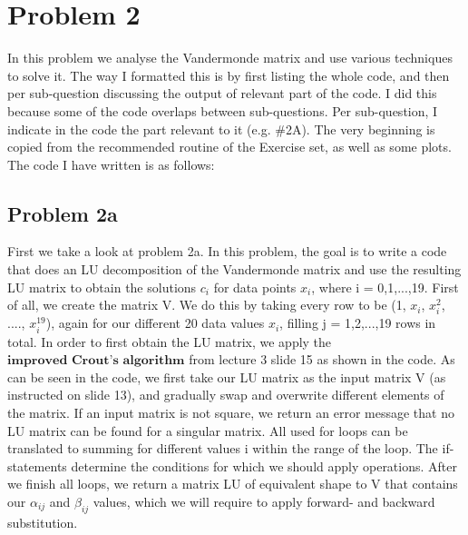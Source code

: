 \section{Problem 2}

In this problem we analyse the Vandermonde matrix and use various techniques to solve it. The way I formatted this is by first listing the whole code, and then per sub-question discussing the output of relevant part of the code. I did this because some of the code overlaps between sub-questions. Per sub-question, I indicate in the code the part relevant to it (e.g. \#2A). The very beginning is copied from the recommended routine of the Exercise set, as well as some plots. The code I have written is as follows: 



\newpage
\subsection{Problem 2a}

First we take a look at problem 2a. In this problem, the goal is to write a code that does an LU decomposition of the Vandermonde matrix and use the resulting LU matrix to obtain the solutions $c_i$ for data points $x_i$, where i = 0,1,...,19. First of all, we create the matrix V. We do this by taking every row to be (1, $x_i$, $x_{i}^2$, ...., $x_{i}^{19}$), again for our different 20 data values $x_i$, filling j = 1,2,...,19 rows in total. In order to first obtain the LU matrix, we apply the $\textbf{improved Crout's algorithm}$ from lecture 3 slide 15 as shown in the code. As can be seen in the code, we first take our LU matrix as the input matrix V (as instructed on slide 13), and gradually swap and overwrite different elements of the matrix. If an input matrix is not square, we return an error message that no LU matrix can be found for a singular matrix. All used for loops can be translated to summing for different values i within the range of the loop. The if-statements determine the conditions for which we should apply operations. After we finish all loops, we return a matrix LU of equivalent shape to V that contains our $\alpha_{ij}$ and $\beta_{ij}$ values, which we will require to apply forward- and backward substitution.\\

